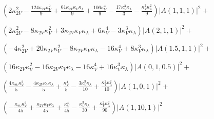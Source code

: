 $
\left(2 \kappa_{2V}^{2} - \frac{124 \kappa_{2V} \kappa_{V}^{2}}{9} + \frac{61 \kappa_{2V} \kappa_{V} \kappa_{\lambda}}{9} + \frac{106 \kappa_{V}^{4}}{9} - \frac{17 \kappa_{V}^{3} \kappa_{\lambda}}{3} - \frac{\kappa_{V}^{2} \kappa_{\lambda}^{2}}{9}\right) \left|{A{\left(1,1,1 \right)}}\right|^{2} +
$

$
\left(2 \kappa_{2V}^{2} - 8 \kappa_{2V} \kappa_{V}^{2} + 3 \kappa_{2V} \kappa_{V} \kappa_{\lambda} + 6 \kappa_{V}^{4} - 3 \kappa_{V}^{3} \kappa_{\lambda}\right) \left|{A{\left(2,1,1 \right)}}\right|^{2} +
$

$
\left(- 4 \kappa_{2V}^{2} + 20 \kappa_{2V} \kappa_{V}^{2} - 8 \kappa_{2V} \kappa_{V} \kappa_{\lambda} - 16 \kappa_{V}^{4} + 8 \kappa_{V}^{3} \kappa_{\lambda}\right) \left|{A{\left(1.5,1,1 \right)}}\right|^{2} +
$

$
\left(16 \kappa_{2V} \kappa_{V}^{2} - 16 \kappa_{2V} \kappa_{V} \kappa_{\lambda} - 16 \kappa_{V}^{4} + 16 \kappa_{V}^{3} \kappa_{\lambda}\right) \left|{A{\left(0,1,0.5 \right)}}\right|^{2} +
$

$
\left(\frac{4 \kappa_{2V} \kappa_{V}^{2}}{5} - \frac{4 \kappa_{2V} \kappa_{V} \kappa_{\lambda}}{5} + \frac{\kappa_{V}^{4}}{5} - \frac{3 \kappa_{V}^{3} \kappa_{\lambda}}{10} + \frac{\kappa_{V}^{2} \kappa_{\lambda}^{2}}{10}\right) \left|{A{\left(1,0,1 \right)}}\right|^{2} +
$

$
\left(- \frac{\kappa_{2V} \kappa_{V}^{2}}{45} + \frac{\kappa_{2V} \kappa_{V} \kappa_{\lambda}}{45} + \frac{\kappa_{V}^{4}}{45} - \frac{\kappa_{V}^{3} \kappa_{\lambda}}{30} + \frac{\kappa_{V}^{2} \kappa_{\lambda}^{2}}{90}\right) \left|{A{\left(1,10,1 \right)}}\right|^{2}
$
